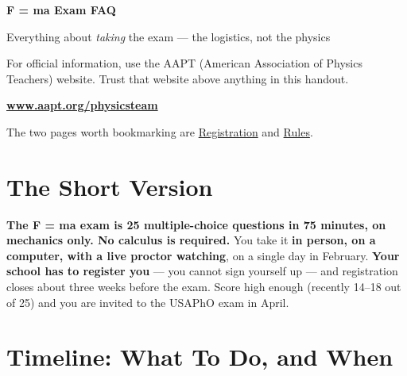 \documentclass[11pt]{article}
\newcommand{\psettitle}[1]{
    \begin{center}
    \huge \textbf{#1}
    \end{center}
}
\begin{document}
\psettitle{F = ma Exam FAQ}
\begin{center}
\large Everything about \emph{taking} the exam --- the logistics, not the physics
\end{center}

\begin{official}
For official information, use the AAPT (American Association of Physics Teachers) website.
Trust that website above anything in this handout.
\begin{center}
\large\bfseries
\href{https://www.aapt.org/physicsteam/}{www.aapt.org/physicsteam}
\end{center}
The two pages worth bookmarking are
\href{https://www.aapt.org/physicsteam/registration.cfm}{Registration} and
\href{https://www.aapt.org/physicsteam/PT-rules.cfm}{Rules}.
\end{official}

\section{The Short Version}

\begin{keybox}
\textbf{The F = ma exam is 25 multiple-choice questions in 75 minutes, on mechanics
only. No calculus is required.} You take it \textbf{in person, on a computer, with a live proctor watching}, on a
single day in February. \textbf{Your school has to register you} --- you cannot sign
yourself up --- and registration closes about three weeks before the exam. Score high
enough (recently 14--18 out of 25) and you are invited to the USAPhO exam in April.
\end{keybox}

\section{Timeline: What To Do, and When}
\end{document}
